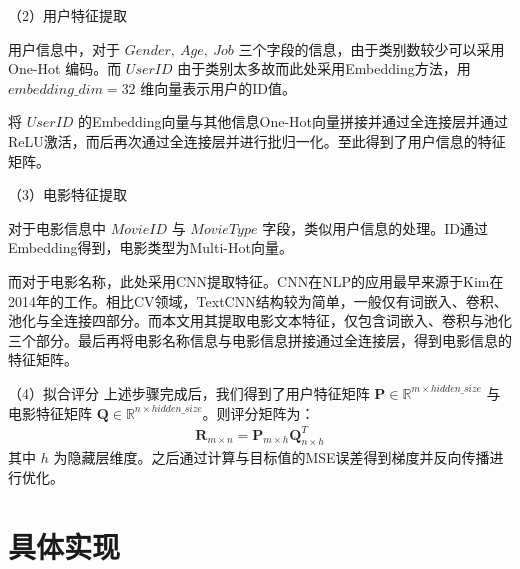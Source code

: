 \begin{spacing}{1.5}
（2）用户特征提取\par
用户信息中，对于 $Gender,\ Age,\ Job$ 三个字段的信息，由于类别数较少可以采用 One-Hot 编码。而 $UserID$ 由于类别太多故而此处采用Embedding方法，用$embedding\_ dim=32$ 维向量表示用户的ID值。\par
将 $UserID$ 的Embedding向量与其他信息One-Hot向量拼接并通过全连接层并通过 ReLU激活，而后再次通过全连接层并进行批归一化。至此得到了用户信息的特征矩阵。\par
（3）电影特征提取\par
对于电影信息中 $MovieID$ 与 $MovieType$ 字段，类似用户信息的处理。ID通过Embedding得到，电影类型为Multi-Hot向量。\par
而对于电影名称，此处采用CNN提取特征。CNN在NLP的应用最早来源于Kim在2014年的工作\cite{4}。相比CV领域，TextCNN结构较为简单，一般仅有词嵌入、卷积、池化与全连接四部分。而本文用其提取电影文本特征，仅包含词嵌入、卷积与池化三个部分。最后再将电影名称信息与电影信息拼接通过全连接层，得到电影信息的特征矩阵。\par
（4）拟合评分
上述步骤完成后，我们得到了用户特征矩阵 $\mathbf{P} \in \mathbb{R}^{m \times hidden\_ size}$ 与电影特征矩阵 $\mathbf{Q} \in \mathbb{R}^{n \times hidden\_ size}$。则评分矩阵为：
{\setlength\abovedisplayskip{1pt}
\setlength\belowdisplayskip{1pt}
\begin{align}
\mathbf{R}_{m\times n}=\mathbf{P}_{m\times h}\mathbf{Q}_{n\times h}^T
\end{align}
}
其中 $h$ 为隐藏层维度。之后通过计算与目标值的MSE误差得到梯度并反向传播进行优化。
\end{spacing}

\section{具体实现}
